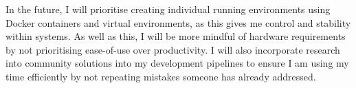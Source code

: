 In the future, I will prioritise creating individual running environments using Docker containers and virtual environments, as this gives me control and stability within systems. As well as this, I will be more mindful of hardware requirements by not prioritising ease-of-use over productivity. I will also incorporate research into community solutions into my development pipelines to ensure I am using my time efficiently by not repeating mistakes someone has already addressed.

